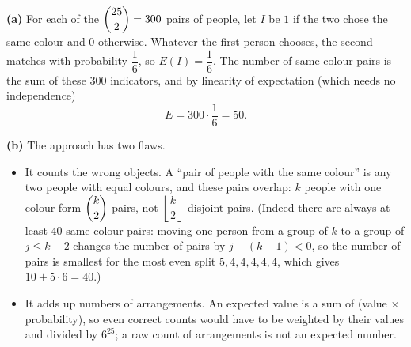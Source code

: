 \textbf{(a)} For each of the $\dbinom{25}{2}=300$ pairs of people, let $I$ be $1$ if the two chose the same colour and $0$ otherwise. Whatever the first person chooses, the second matches with probability $\dfrac16$, so $E(I)=\dfrac16$. The number of same-colour pairs is the sum of these $300$ indicators, and by linearity of expectation (which needs no independence)
\[E=300\cdot\dfrac16=\boxed{50}.\]

\textbf{(b)} The approach has two flaws.
\begin{itemize}
\item It counts the wrong objects. A ``pair of people with the same colour'' is any two people with equal colours, and these pairs overlap: $k$ people with one colour form $\dbinom k2$ pairs, not $\left\lfloor\dfrac k2\right\rfloor$ disjoint pairs. (Indeed there are always at least $40$ same-colour pairs: moving one person from a group of $k$ to a group of $j\le k-2$ changes the number of pairs by $j-(k-1)<0$, so the number of pairs is smallest for the most even split $5,4,4,4,4,4$, which gives $10+5\cdot6=40$.)
\item It adds up numbers of arrangements. An expected value is a sum of (value $\times$ probability), so even correct counts would have to be weighted by their values and divided by $6^{25}$; a raw count of arrangements is not an expected number.
\end{itemize}
